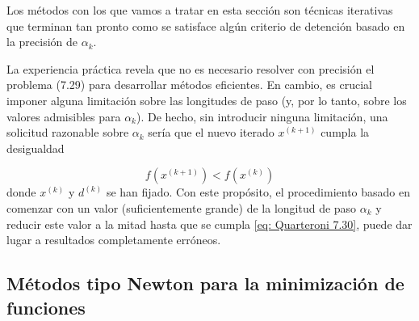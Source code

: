 Los métodos con los que vamos a tratar en esta sección son técnicas iterativas que terminan tan pronto como se satisface algún criterio de detención basado en la precisión de \( \alpha_k \).

La experiencia práctica revela que no es necesario resolver con precisión el problema (7.29) para desarrollar métodos eficientes. En cambio, es crucial imponer alguna limitación sobre las longitudes de paso (y, por lo tanto, sobre los valores admisibles para \( \alpha_k \)). De hecho, sin introducir ninguna limitación, una solicitud razonable sobre \( \alpha_k \) sería que el nuevo iterado \( x^{(k+1)} \) cumpla la desigualdad

\begin{equation}
    \label{eq: Quarteroni 7.30}
    f(x^{(k+1)}) < f(x^{(k)})
\end{equation}
donde \( x^{(k)} \) y \( d^{(k)} \) se han fijado. Con este propósito, el procedimiento basado en comenzar con un valor (suficientemente grande) de la longitud de paso \( \alpha_k \) y reducir este valor a la mitad hasta que se cumpla \ref{eq: Quarteroni 7.30}, puede dar lugar a resultados completamente erróneos.



\subsection{Métodos tipo Newton para la minimización de funciones}

